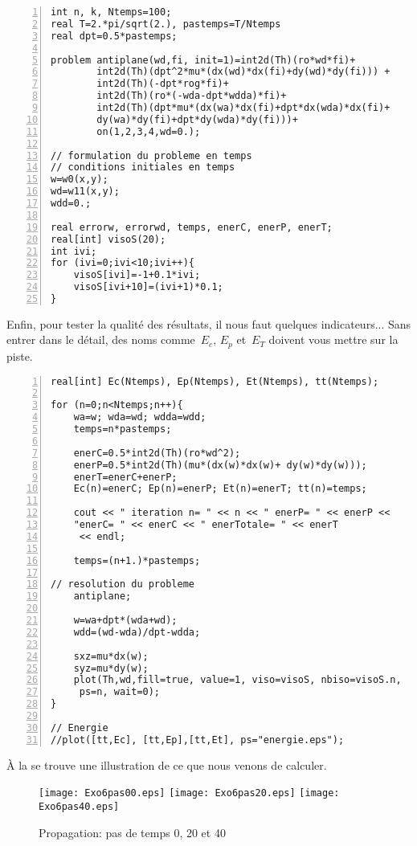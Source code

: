 \color{gris}\scriptsize
\begin{Verbatim}[numbers=left,numbersep=3pt,firstnumber=last]
int n, k, Ntemps=100; 
real T=2.*pi/sqrt(2.), pastemps=T/Ntemps
real dpt=0.5*pastemps; 

problem antiplane(wd,fi, init=1)=int2d(Th)(ro*wd*fi)+ 
		int2d(Th)(dpt^2*mu*(dx(wd)*dx(fi)+dy(wd)*dy(fi))) + 
		int2d(Th)(-dpt*rog*fi)+
		int2d(Th)(ro*(-wda-dpt*wdda)*fi)+
		int2d(Th)(dpt*mu*(dx(wa)*dx(fi)+dpt*dx(wda)*dx(fi)+
		dy(wa)*dy(fi)+dpt*dy(wda)*dy(fi)))+
		on(1,2,3,4,wd=0.); 

// formulation du probleme en temps
// conditions initiales en temps
w=w0(x,y);
wd=w11(x,y); 
wdd=0.; 

real errorw, errorwd, temps, enerC, enerP, enerT; 
real[int] visoS(20);
int ivi; 
for (ivi=0;ivi<10;ivi++){
	visoS[ivi]=-1+0.1*ivi;
	visoS[ivi+10]=(ivi+1)*0.1;
}
\end{Verbatim}
\color{black}\normalsize

\medskip
Enfin, pour tester la qualité des résultats, il nous faut quelques indicateurs...
Sans entrer dans le détail, des noms comme~$E_c$, $E_p$ et~$E_T$ doivent vous mettre sur
la piste.

\color{gris}\scriptsize
\begin{Verbatim}[numbers=left,numbersep=3pt,firstnumber=last]
real[int] Ec(Ntemps), Ep(Ntemps), Et(Ntemps), tt(Ntemps); 

for (n=0;n<Ntemps;n++){	
	wa=w; wda=wd; wdda=wdd; 	
	temps=n*pastemps; 

	enerC=0.5*int2d(Th)(ro*wd^2);
	enerP=0.5*int2d(Th)(mu*(dx(w)*dx(w)+ dy(w)*dy(w)));
	enerT=enerC+enerP;
	Ec(n)=enerC; Ep(n)=enerP; Et(n)=enerT; tt(n)=temps; 
		
	cout << " iteration n= " << n << " enerP= " << enerP << 
    "enerC= " << enerC << " enerTotale= " << enerT 
     << endl;
	
	temps=(n+1.)*pastemps; 

// resolution du probleme 
	antiplane;
	
	w=wa+dpt*(wda+wd);
	wdd=(wd-wda)/dpt-wdda; 

	sxz=mu*dx(w);
	syz=mu*dy(w); 
	plot(Th,wd,fill=true, value=1, viso=visoS, nbiso=visoS.n, 
     ps=n, wait=0); 	
}

// Energie 
//plot([tt,Ec], [tt,Ep],[tt,Et], ps="energie.eps"); 
\end{Verbatim}
\color{black}\normalsize

\medskip
À la  se trouve une illustration de ce que nous venons de calculer.

\begin{figure}[ht]
  \center
  \texttt{[image: Exo6pas00.eps]} \hfill
  \texttt{[image: Exo6pas20.eps]} \hfill
  \texttt{[image: Exo6pas40.eps]}
  \caption{\label{Fig-Exo6} Propagation: pas de temps 0, 20 et 40}
\end{figure}

